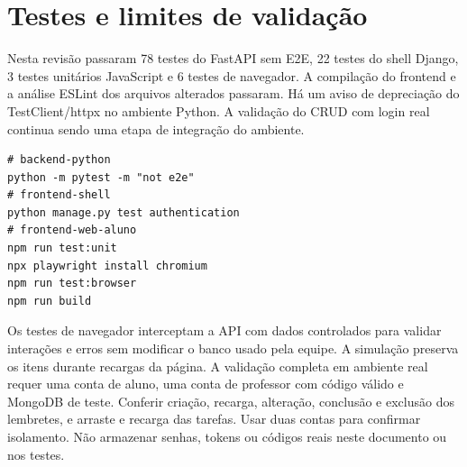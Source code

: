 \documentclass[11pt,a4paper]{article}
\begin{document}
\section{Testes e limites de validação}
Nesta revisão passaram 78 testes do FastAPI sem E2E, 22 testes do shell Django, 3 testes unitários JavaScript e 6 testes de navegador. A compilação do frontend e a análise ESLint dos arquivos alterados passaram. Há um aviso de depreciação do TestClient/httpx no ambiente Python. A validação do CRUD com login real continua sendo uma etapa de integração do ambiente.
\begin{verbatim}
# backend-python
python -m pytest -m "not e2e"
# frontend-shell
python manage.py test authentication
# frontend-web-aluno
npm run test:unit
npx playwright install chromium
npm run test:browser
npm run build
\end{verbatim}
Os testes de navegador interceptam a API com dados controlados para validar interações e erros sem modificar o banco usado pela equipe. A simulação preserva os itens durante recargas da página.
A validação completa em ambiente real requer uma conta de aluno, uma conta de professor com código válido e MongoDB de teste. Conferir criação, recarga, alteração, conclusão e exclusão dos lembretes, e arraste e recarga das tarefas. Usar duas contas para confirmar isolamento.
Não armazenar senhas, tokens ou códigos reais neste documento ou nos testes.
\end{document}
